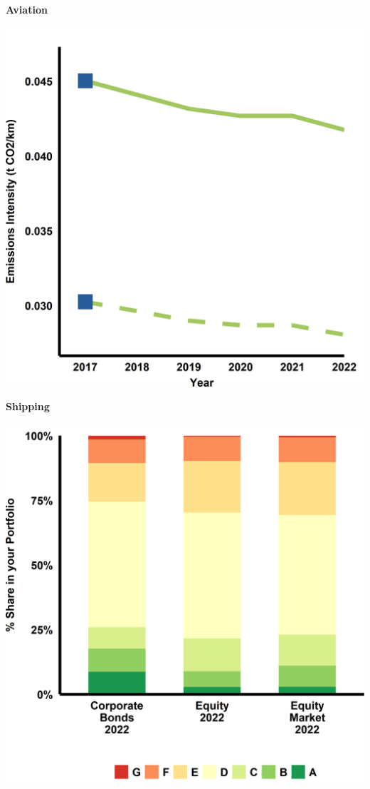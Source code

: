 \documentclass[10pt,table,a4]{article}\usepackage[]{graphicx}\usepackage[]{color}
\begin{document}
		\begin{multicols}{2}
		
			\textbf{Aviation}
			
			\includegraphics[width=.9\linewidth]{Figures/Fig43}

			\textbf{Shipping}
			
			\includegraphics[width=.9\linewidth]{Figures/Fig44}
			
		\end{multicols}
	
\end{document}
